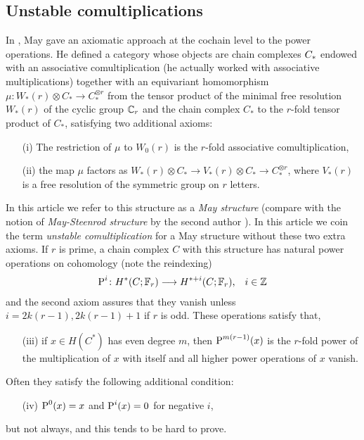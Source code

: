 \subsection{Unstable comultiplications} In \cite{may1970general}, May gave an axiomatic approach at the cochain level to the power operations. He defined a category whose objects are chain complexes $C_{*}$ endowed with an associative comultiplication (he actually worked with associative multiplications) together with an equivariant homomorphism $\mu\colon W_*(r)\otimes C_*\to C_*^{\otimes r}$ from the tensor product of the minimal free resolution $W_*(r)$ of the cyclic group $\mathbb{C}_r$ and the chain complex $C_*$ to the $r$-fold tensor product of $C_*$, satisfying two additional axioms: 
\begin{itemize}
\item[(i)] The restriction of $\mu$ to $W_0(r)$ is the $r$-fold associative comultiplication,
\item[(ii)] the map $\mu$ factors as $W_*(r)\otimes C_* \to V_*(r)\otimes C_*\to C_*^{\otimes r} $, where $V_*(r)$ is a free resolution of the symmetric group on $r$ letters.
\end{itemize}
In this article we refer to this structure as a \emph{May structure} (compare with the notion of \emph{May-Steenrod structure} by the second author \cite{medina2021may_st}). In this article we coin the term \emph{unstable comultiplication} for a May structure without these two extra axioms. If $r$ is prime, a chain complex $C$ with this structure has natural power operations on cohomology (note the reindexing)
\begin{align*}
	\operatorname{P}^i\colon H^*(C;\mathbb{F}_r)&\longrightarrow H^{*+i}(C;\mathbb{F}_r), & i\in \mathbb{Z}
\end{align*}
and the second axiom assures that they vanish unless $i = 2k(r-1), 2k(r-1)+1$ if $r$ is odd. These operations satisfy that, 
\begin{itemize}
\item[(iii)] if $x\in H(C^*)$ has even degree $m$, then $\operatorname{P}^{m(r-1)}(x)$ is the $r$-fold power of the multiplication of $x$ with itself and all higher power operations of $x$ vanish.
\end{itemize}
 Often they satisfy the following additional condition:
\begin{itemize}
\item[(iv)] $\operatorname{P}^0(x) = x$ and $\operatorname{P}^i(x) = 0$ for negative $i$, 
\end{itemize}
but not always, and this tends to be hard to prove.


